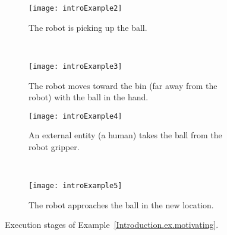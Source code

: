 \begin{figure}[h!]
    \centering
    \begin{subfigure}[t]{0.45\columnwidth}
        \centering
\texttt{[image: introExample2]} %
   \caption{The robot is picking up the ball.}
       \label{IN.fig.FSMEx1}
    \end{subfigure}
    ~  \begin{subfigure}[t]{0.45\columnwidth}
        \centering
\texttt{[image: introExample3]} %
   \caption{The robot moves toward the bin (far away from the robot) with the ball in the hand.}
       \label{IN.fig.FSMEx2}
    \end{subfigure}
    
    
        \begin{subfigure}[b]{0.45\columnwidth}
        \centering
\texttt{[image: introExample4]} %
   \caption{An external entity (a human) takes the ball from the robot gripper.}
       \label{IN.fig.FSMEx3}
    \end{subfigure}
    ~  \begin{subfigure}[b]{0.45\columnwidth}
        \centering
\texttt{[image: introExample5]} %
   \caption{The robot approaches the ball in the new location.}
       \label{IN.fig.FSMEx4}
    \end{subfigure}
    \caption{Execution stages of Example~\ref{Introduction.ex.motivating}.}
    \label{IN.fig.FSMEx}
\end{figure}

